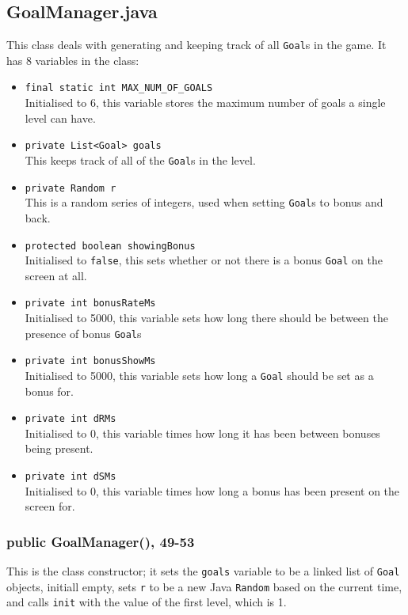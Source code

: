 \documentclass[12pt]{article}
\begin{document}
\subsection{GoalManager.java}
This class deals with generating and keeping track of all \verb|Goal|s in the game.
It has 8 variables in the class:
\begin{itemize}
  \item \verb|final static int MAX_NUM_OF_GOALS|\\
        Initialised to 6, this variable stores the maximum number of goals a single level can have.
  \item \verb|private List<Goal> goals|\\
        This keeps track of all of the \verb|Goal|s in the level.
  \item \verb|private Random r|\\
        This is a random series of integers, used when setting \verb|Goal|s to bonus and back.
  \item \verb|protected boolean showingBonus|\\
        Initialised to \verb|false|, this sets whether or not there is a bonus \verb|Goal| on the screen at all.
  \item \verb|private int bonusRateMs|\\
        Initialised to 5000, this variable sets how long there should be between the presence of bonus \verb|Goal|s
  \item \verb|private int bonusShowMs|\\
        Initialised to 5000, this variable sets how long a \verb|Goal| should be set as a bonus for.
  \item \verb|private int dRMs|\\
        Initialised to 0, this variable times how long it has been between bonuses being present.
  \item \verb|private int dSMs|\\
        Initialised to 0, this variable times how long a bonus has been present on the screen for.
\end{itemize}

\subsubsection{public GoalManager(), 49-53}
This is the class constructor; it sets the \verb|goals| variable to be a linked list of \verb|Goal| objects, initiall empty, sets \verb|r| to be a new Java \verb|Random| based on the current time, and calls \verb|init| with the value of the first level, which is 1.
\end{document}
